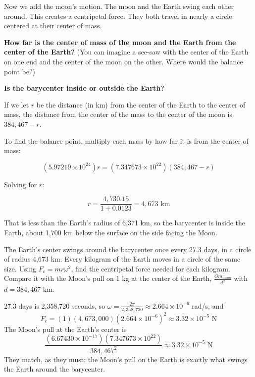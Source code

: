 \begin{Exercise}[title={Life Among the Orbits 4: The Swing of the Moon}, label=life-orbits4]

Now we add the moon's motion.  The moon and the Earth swing each other around.  This creates a centripetal force.  They both travel in nearly a circle centered at their center of mass.

\textbf{How far is the center of mass of the moon and the Earth from the center of the Earth?}  (You can imagine a see-saw with the center of the Earth on one end and the center of the moon on the other.   Where would the balance point be?)

\textbf{Is the barycenter inside or outside the Earth?}


\end{Exercise}

\begin{Answer}[ref=life-orbits4]

If we let $r$ be the distance (in km) from the center of the Earth to the center of mass,  the distance from
the center of the mass to the center of the moon is $384,467 - r$.

To find the balance point,  multiply each mass by how far it is from the center of mass:

$$\left( 5.97219 \times 10^{24} \right) r = \left( 7.347673 \times 10^{22} \right) \left(384,467 - r\right)$$

Solving for $r$:

$$ r = \frac{4,730.15}{1 + 0.0123} = 4,673 \text{ km} $$

That is less than the Earth's radius of 6,371 km, so the barycenter is
inside the Earth, about 1,700 km below the surface on the side facing the
Moon.

\end{Answer}

\begin{Exercise}[title={Life Among the Orbits 5: The Needed Pull}, label=life-orbits5]
The Earth's center swings around the barycenter once every 27.3 days, in a
circle of radius 4,673 km. Every kilogram of the Earth moves in a circle of
the same size. Using $F_c = m r \omega^2$, find the centripetal force needed
for each kilogram. Compare it with the Moon's pull on 1 kg at the center of
the Earth, $\frac{G m_{moon}}{d^2}$ with $d = 384{,}467$ km.
\end{Exercise}

\begin{Answer}[ref=life-orbits5]
27.3 days is 2,358,720 seconds, so $\omega = \frac{2\pi}{2{,}358{,}720} \approx 2.664 \times 10^{-6}$ rad/s, and
$$F_c = (1)(4{,}673{,}000)(2.664 \times 10^{-6})^2 \approx 3.32 \times 10^{-5} \text{ N}$$
The Moon's pull at the Earth's center is
$$\frac{(6.67430 \times 10^{-17})(7.347673 \times 10^{22})}{384{,}467^2} \approx 3.32 \times 10^{-5} \text{ N}$$
They match, as they must: the Moon's pull on the Earth is exactly what
swings the Earth around the barycenter.
\end{Answer}

